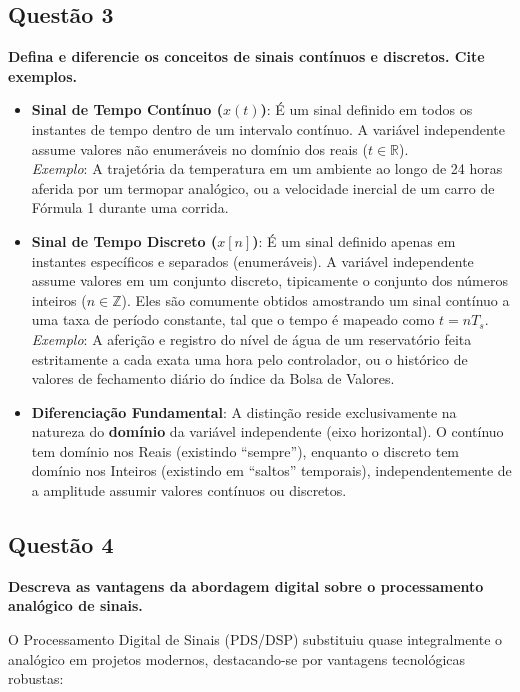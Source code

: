 \subsection{Questão 3}\label{questuxe3o-3}

\textbf{Defina e diferencie os conceitos de sinais contínuos e discretos. Cite exemplos.}

\begin{itemize}
\item
  \textbf{Sinal de Tempo Contínuo (\(x(t)\))}: É um sinal definido em todos os instantes de tempo dentro de um intervalo contínuo. A variável independente assume valores não enumeráveis no domínio dos reais (\(t \in \mathbb{R}\)).\\
  \emph{Exemplo}: A trajetória da temperatura em um ambiente ao longo de 24 horas aferida por um termopar analógico, ou a velocidade inercial de um carro de Fórmula 1 durante uma corrida.
\item
  \textbf{Sinal de Tempo Discreto (\(x[n]\))}: É um sinal definido apenas em instantes específicos e separados (enumeráveis). A variável independente assume valores em um conjunto discreto, tipicamente o conjunto dos números inteiros (\(n \in \mathbb{Z}\)). Eles são comumente obtidos amostrando um sinal contínuo a uma taxa de período constante, tal que o tempo é mapeado como \(t = nT_s\).\\
  \emph{Exemplo}: A aferição e registro do nível de água de um reservatório feita estritamente a cada exata uma hora pelo controlador, ou o histórico de valores de fechamento diário do índice da Bolsa de Valores.
\item
  \textbf{Diferenciação Fundamental}: A distinção reside exclusivamente na natureza do \textbf{domínio} da variável independente (eixo horizontal). O contínuo tem domínio nos Reais (existindo ``sempre''), enquanto o discreto tem domínio nos Inteiros (existindo em ``saltos'' temporais), independentemente de a amplitude assumir valores contínuos ou discretos.
\end{itemize}

\subsection{Questão 4}\label{questuxe3o-4}

\textbf{Descreva as vantagens da abordagem digital sobre o processamento analógico de sinais.}

O Processamento Digital de Sinais (PDS/DSP) substituiu quase integralmente o analógico em projetos modernos, destacando-se por vantagens tecnológicas robustas:

